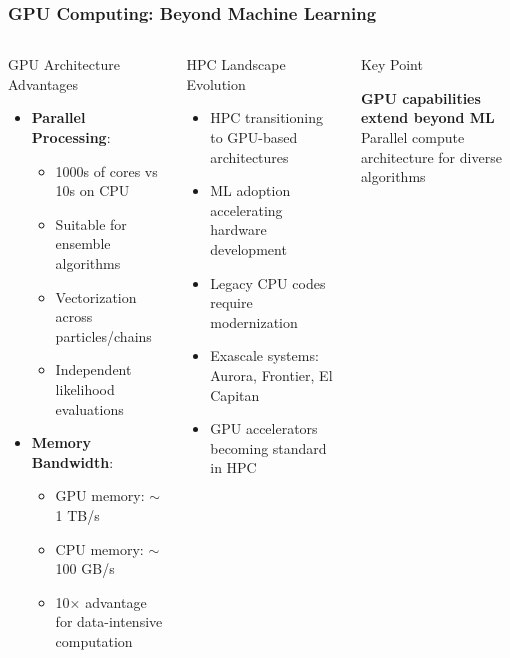 \documentclass[aspectratio=169]{beamer}
\begin{document}
\begin{frame}
    \frametitle{GPU Computing: Beyond Machine Learning}
    \begin{columns}
        \begin{block}{GPU Architecture Advantages}
            \begin{itemize}
                \item \textbf{Parallel Processing}:
                    \begin{itemize}
                        \item 1000s of cores vs 10s on CPU
                        \item Suitable for ensemble algorithms
                        \item Vectorization across particles/chains
                        \item Independent likelihood evaluations
                    \end{itemize}
                \item \textbf{Memory Bandwidth}:
                    \begin{itemize}
                        \item GPU memory: $\sim$1 TB/s
                        \item CPU memory: $\sim$100 GB/s
                        \item 10× advantage for data-intensive computation
                    \end{itemize}
            \end{itemize}
        \end{block}
        \begin{block}{HPC Landscape Evolution}
            \begin{itemize}
                \item HPC transitioning to GPU-based architectures
                \item ML adoption accelerating hardware development
                \item Legacy CPU codes require modernization
                \item Exascale systems: Aurora, Frontier, El Capitan
                \item GPU accelerators becoming standard in HPC
            \end{itemize}
        \end{block}
        \begin{block}{Key Point}
            \begin{center}
                \textbf{GPU capabilities extend beyond ML}\\
                Parallel compute architecture for diverse algorithms
            \end{center}
        \end{block}
    \end{columns}
\end{frame}
\end{document}
